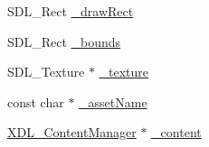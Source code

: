 \begin{DoxyCompactItemize}
S\-D\-L\-\_\-\-Rect \hyperlink{class_x_d_l___sprite_ad83f66f89a449230516e37534a228af7}{\-\_\-draw\-Rect}
\item 
S\-D\-L\-\_\-\-Rect \hyperlink{class_x_d_l___sprite_a5dab4417ad28c6d3615c4716dcf3ea07}{\-\_\-bounds}
\item 
S\-D\-L\-\_\-\-Texture $\ast$ \hyperlink{class_x_d_l___sprite_a8e385099b36a25f00322acd2b353751e}{\-\_\-texture}
\item 
const char $\ast$ \hyperlink{class_x_d_l___sprite_a8e50211a0f424c3a77753a206232f9ef}{\-\_\-asset\-Name}
\item 
\hyperlink{class_x_d_l___content_manager}{X\-D\-L\-\_\-\-Content\-Manager} $\ast$ \hyperlink{class_x_d_l___sprite_a39231e3b79b80ebb38cc9c9d5e1b4323}{\-\_\-content}
\end{DoxyCompactItemize}


